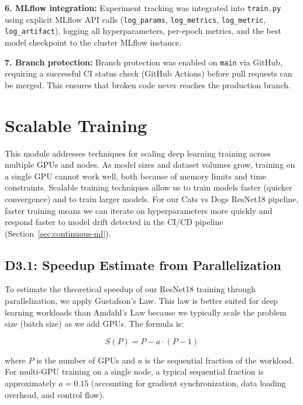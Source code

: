 \documentclass[10pt,twocolumn,letterpaper]{article}
\begin{document}
\textbf{6. MLflow integration:} Experiment tracking was integrated into \texttt{train.py} using explicit MLflow API calls (\texttt{log\_params}, \texttt{log\_metrics}, \texttt{log\_metric}, \texttt{log\_artifact}), logging all hyperparameters, per-epoch metrics, and the best model checkpoint to the cluster MLflow instance.

\textbf{7. Branch protection:} Branch protection was enabled on \texttt{main} via GitHub, requiring a successful CI status check (GitHub Actions) before pull requests can be merged. This ensures that broken code never reaches the production branch.

\section{Scalable Training}\label{sec:scalable-training}

This module addresses techniques for scaling deep learning training across multiple GPUs and nodes. As model sizes and dataset volumes grow, training on a single GPU cannot work well, both because of memory limits and time constraints. Scalable training techniques allow us to train models faster (quicker convergence) and to train larger models. For our Cats vs Dogs ResNet18 pipeline, faster training means we can iterate on hyperparameters more quickly and respond faster to model drift detected in the CI/CD pipeline (Section~\ref{sec:continuous-ml}).

\subsection{D3.1: Speedup Estimate from Parallelization}

To estimate the theoretical speedup of our ResNet18 training through parallelization, we apply Gustafson's Law. This law is better suited for deep learning workloads than Amdahl's Law because we typically scale the problem size (batch size) as we add GPUs. The formula is:

\begin{equation}
    S(P) = P - a \cdot (P - 1)
    \label{eq:gustafson}
\end{equation}

where $P$ is the number of GPUs and $a$ is the sequential fraction of the workload. For multi-GPU training on a single node, a typical sequential fraction is approximately $a = 0.15$ (accounting for gradient synchronization, data loading overhead, and control flow).
\end{document}
